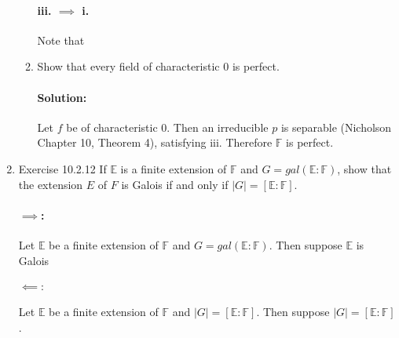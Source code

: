 \documentclass{article}
\begin{document}
\begin{enumerate}
\begin{enumerate}
          \paragraph{iii. $\implies$ i. } Note that

        \item Show that every field of characteristic 0 is perfect.
          \paragraph{Solution:} Let $f$ be of characteristic $0$. Then an irreducible $p$ is separable 
          (Nicholson Chapter 10, Theorem 4), satisfying iii. Therefore $\mathbb{F}$ is perfect.
      \end{enumerate}
\item Exercise 10.2.12 If $\mathbb{E}$ is a finite extension of $\mathbb{F}$ and 
    $G = gal( \mathbb{E} : \mathbb{F})$, show that the extension $E$ of $F$ is Galois if and only if 
    $|G| = [\mathbb{E} : \mathbb{F}]$.
    \paragraph{$\implies$:} Let $\mathbb{E}$ be a finite extension of $\mathbb{F}$ and 
    $G=gal(\mathbb{E}:\mathbb{F})$. Then suppose $\mathbb{E}$ is Galois 

    \paragraph{$\impliedby:$} Let $\mathbb{E}$ be a finite extension of $\mathbb{F}$ and 
    $|G| = [\mathbb{E} : \mathbb{F}]$. Then suppose $|G|=[\mathbb{E}:\mathbb{F}]$.

\end{enumerate}
\end{document}
